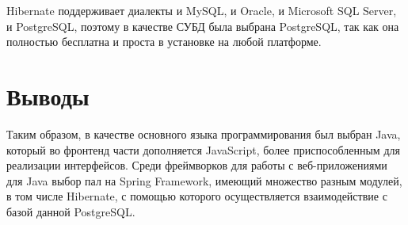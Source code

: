 Hibernate поддерживает диалекты и MySQL, и Oracle, и Microsoft SQL Server, и PostgreSQL, поэтому в качестве СУБД была выбрана PostgreSQL, так как она полностью бесплатна и проста в установке на любой платформе.

\section{Выводы} \label{ch3:conclusion}
Таким образом, в качестве основного языка программирования был выбран Java, который во фронтенд части дополняется JavaScript, более приспособленным для реализации интерфейсов. Среди фреймворков для работы с веб-приложениями для Java выбор пал на Spring Framework, имеющий множество разным модулей, в том числе Hibernate, с помощью которого осуществляется взаимодействие с базой данной PostgreSQL.

\begin{comment}
Текст выводов по главе \thechapter.
\section{Название параграфа} \label{ch2:sec-abbr} %

Название параграфа оформляется с помощью команды \verb|\section{...}|, название главы --- \verb|\chapter{...}|. 
\end{comment}